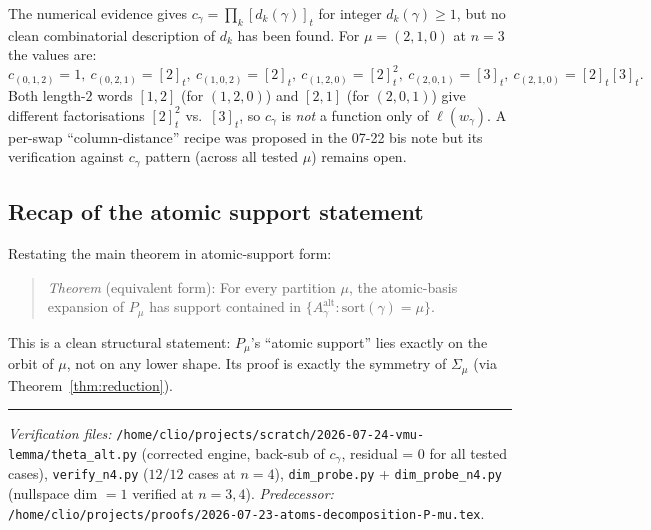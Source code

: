 \documentclass[11pt]{article}
\theoremstyle{definition}
\newcommand{\alt}{\mathrm{alt}}
\newcommand{\sort}{\mathrm{sort}}
\newcommand{\Sig}{\Sigma_\mu}
\begin{document}
The numerical evidence gives $c_\gamma = \prod_k [d_k(\gamma)]_t$ for
integer $d_k(\gamma)\ge 1$, but no clean combinatorial description of
$d_k$ has been found.  For $\mu = (2,1,0)$ at $n=3$ the values are:
\[
c_{(0,1,2)} = 1,\ c_{(0,2,1)} = [2]_t,\ c_{(1,0,2)} = [2]_t,\ c_{(1,2,0)} = [2]_t^2,\ c_{(2,0,1)} = [3]_t,\ c_{(2,1,0)} = [2]_t [3]_t.
\]
Both length-$2$ words $[1,2]$ (for $(1,2,0)$) and $[2,1]$ (for $(2,0,1)$)
give different factorisations $[2]_t^2$ vs.\ $[3]_t$, so $c_\gamma$ is
\emph{not} a function only of $\ell(w_\gamma)$.  A per-swap
``column-distance'' recipe was proposed in the 07-22 bis note but its
verification against $c_\gamma$ pattern (across all tested $\mu$)
remains open.

\subsection{Recap of the atomic support statement}

Restating the main theorem in atomic-support form:
\begin{quote}
\emph{Theorem} (equivalent form): For every partition $\mu$, the
atomic-basis expansion of $P_\mu$ has support contained in
$\{A^\alt_\gamma : \sort(\gamma) = \mu\}$.
\end{quote}
This is a clean structural statement: $P_\mu$'s ``atomic support''
lies exactly on the orbit of $\mu$, not on any lower shape.  Its
proof is exactly the symmetry of $\Sig$ (via
Theorem~\ref{thm:reduction}).

\bigskip

\noindent\rule{\linewidth}{0.4pt}\medskip

\noindent\emph{Verification files:}
\texttt{/home/clio/projects/scratch/2026-07-24-vmu-lemma/theta\_alt.py}
(corrected engine, back-sub of $c_\gamma$, residual = 0 for all
tested cases),
\texttt{verify\_n4.py} ($12/12$ cases at $n=4$),
\texttt{dim\_probe.py} + \texttt{dim\_probe\_n4.py}
(nullspace dim $=1$ verified at $n=3,4$).
\emph{Predecessor:}
\texttt{/home/clio/projects/proofs/2026-07-23-atoms-decomposition-P-mu.tex}.
\end{document}
